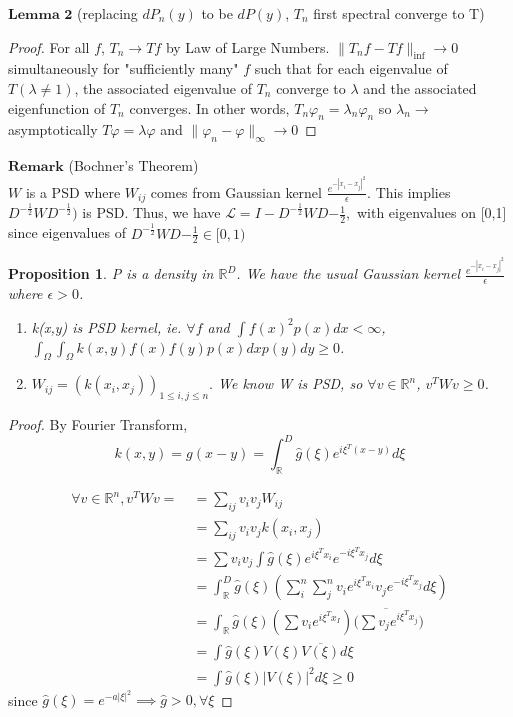 \documentclass[12pt]{article}
\theoremstyle{plain}
\newtheorem*{proposition}{Proposition}
\begin{document}
$\textbf{Lemma 2}$ (replacing $dP_n(y)$ to be $dP(y)$, $T_n$ first spectral converge to T)

\begin{proof}
For all $f$, $T_n \rightarrow Tf$ by Law of Large Numbers. $\|T_nf - Tf\|_{\inf} \rightarrow 0$ simultaneously for "sufficiently many" $f$ such that for each eigenvalue of $T (\lambda \neq 1)$, the associated eigenvalue of $T_n$ converge to $\lambda$ and the associated eigenfunction of $T_n$ converges. In other words, 
$ T_n \varphi_n = \lambda_n \varphi_n $ so $ \lambda_n \rightarrow$asymptotically 
$T\varphi = \lambda \varphi$ and $ \| \varphi_n- \varphi \|_{\infty} \rightarrow 0$
\end{proof}

$\textbf{Remark}$ (Bochner's Theorem) \\
$W$ is a PSD where $W_{ij}$ comes from Gaussian kernel $\frac{e^{-|x_i - x_j|^2}}{\epsilon}$. This implies $D^{-\frac{1}{2}}WD^{-\frac{1}{2}})$ is PSD. Thus, we have $\mathcal{L} = I - D^{-\frac{1}{2}}WD{-\frac{1}{2}},$ with eigenvalues on [0,1] since eigenvalues of $D^{-\frac{1}{2}}WD{-\frac{1}{2}} \in [0,1)$

\begin{proposition}
P is a density in $\mathds{R}^D$. We have the usual Gaussian kernel $\frac{e^{-|x_i - x_j|^2}}{\epsilon}$ where $\epsilon > 0$. 
	\begin{enumerate}
	\item k(x,y) is PSD kernel, ie. $\forall f$ and $\int f(x)^2p(x)dx < \infty$, $\int_\Omega \int_\Omega k(x,y)f(x)f(y) p(x) dx p(y) dy \geq 0$. 
	\item $W_{ij} = (k(x_i,x_j))_{1 \leq i, j \leq n}.$ We know W is PSD, so $\forall v \in \mathds{R}^n$, $v^TWv \geq 0$. 
	\end{enumerate}
\end{proposition} 

\begin{proof}
By Fourier Transform,
$$ k(x,y) = g(x-y) = \int_\mathds{R}^D \hat{g}(\xi)e^{i\xi^T(x-y)}d\xi $$

	\begin{align*}
	\forall v \in \mathds{R}^n, v^TWv = \ &=\sum_{ij}v_i v_j W_{ij} \\
	&= \sum_{ij} v_i v_j k(x_i,x_j) \\
	&= \sum v_i v_j \int \hat{g}(\xi)e^{i\xi^Tx_i}e^{-i\xi^Tx_j} d\xi \\
	&= \int_\mathds{R}^D \hat{g}(\xi)(\sum_i^n \sum_j^n v_i e^{i\xi^Tx_i} v_j e^{-i\xi^Tx_j} d\xi) \\
	&= \int_\mathds{R} \hat{g}(\xi)(\sum v_i e^{i\xi^Tx_I})\overline{(\sum v_j e^{i\xi^Tx_j}}) \\
	&= \int \hat{g}(\xi) V(\xi) \overline{V(\xi)} d\xi \\
	&= \int \hat{g}(\xi) |V(\xi)|^2 d\xi \geq 0
	\end{align*}
since $\hat{g}(\xi) = e^{-a|\xi|^2} \implies \hat{g} > 0,  \forall \xi$ 
\end{proof}
\end{document}
